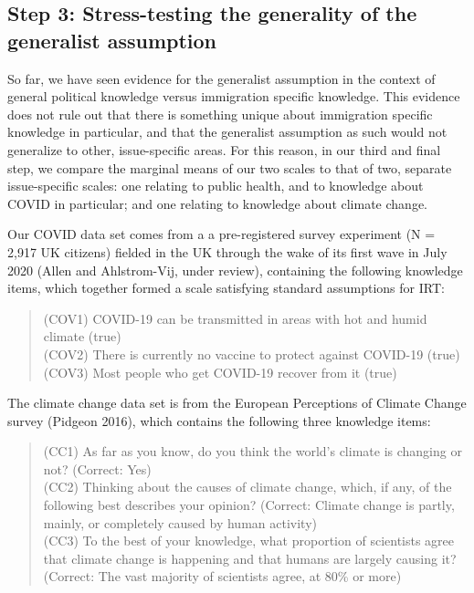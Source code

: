 \documentclass[12pt,halfline,a4paper,]{ouparticle}
\begin{document}
\hypertarget{step-3-stress-testing-the-generality-of-the-generalist-assumption}{%
\subsection{Step 3: Stress-testing the generality of the generalist
assumption}\label{step-3-stress-testing-the-generality-of-the-generalist-assumption}}

So far, we have seen evidence for the generalist assumption in the
context of general political knowledge versus immigration specific
knowledge. This evidence does not rule out that there is something
unique about immigration specific knowledge in particular, and that the
generalist assumption as such would not generalize to other,
issue-specific areas. For this reason, in our third and final step, we
compare the marginal means of our two scales to that of two, separate
issue-specific scales: one relating to public health, and to knowledge
about COVID in particular; and one relating to knowledge about climate
change.

Our COVID data set comes from a a pre-registered survey experiment (N =
2,917 UK citizens) fielded in the UK through the wake of its first wave
in July 2020 (Allen and Ahlstrom-Vij, under review), containing the
following knowledge items, which together formed a scale satisfying
standard assumptions for IRT:

\begin{quote}
(COV1) COVID-19 can be transmitted in areas with hot and humid climate
(true)\\
(COV2) There is currently no vaccine to protect against COVID-19
(true)\\
(COV3) Most people who get COVID-19 recover from it (true)
\end{quote}

The climate change data set is from the European Perceptions of Climate
Change survey (Pidgeon 2016), which contains the following three
knowledge items:

\begin{quote}
(CC1) As far as you know, do you think the world's climate is changing
or not? (Correct: Yes)\\
(CC2) Thinking about the causes of climate change, which, if any, of the
following best describes your opinion? (Correct: Climate change is
partly, mainly, or completely caused by human activity)\\
(CC3) To the best of your knowledge, what proportion of scientists agree
that climate change is happening and that humans are largely causing it?
(Correct: The vast majority of scientists agree, at 80\% or more)
\end{quote}
\end{document}
